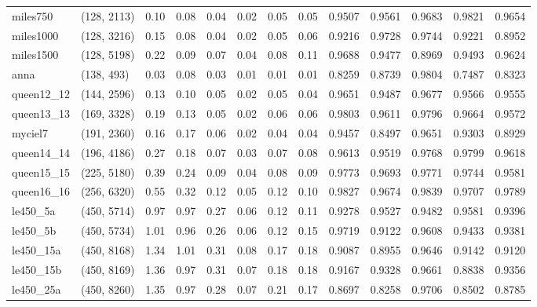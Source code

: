 \begin{tabular}{llrrrrrrrrrrr}
  miles750 &  (128, 2113) &  0.10 & 0.08 & 0.04 & 0.02 &  0.05 &   0.05 &   0.9507 &   0.9561 &    0.9683 &     0.9821 &      0.9654 \\
 miles1000 &  (128, 3216) &  0.15 & 0.08 & 0.04 & 0.02 &  0.05 &   0.06 &   0.9216 &   0.9728 &    0.9744 &     0.9221 &      0.8952 \\
 miles1500 &  (128, 5198) &  0.22 & 0.09 & 0.07 & 0.04 &  0.08 &   0.11 &   0.9688 &   0.9477 &    0.8969 &     0.9493 &      0.9624 \\
      anna &   (138, 493) &  0.03 & 0.08 & 0.03 & 0.01 &  0.01 &   0.01 &   0.8259 &   0.8739 &    0.9804 &     0.7487 &      0.8323 \\
queen12\_12 &  (144, 2596) &  0.13 & 0.10 & 0.05 & 0.02 &  0.05 &   0.04 &   0.9651 &   0.9487 &    0.9677 &     0.9566 &      0.9555 \\
queen13\_13 &  (169, 3328) &  0.19 & 0.13 & 0.05 & 0.02 &  0.06 &   0.06 &   0.9803 &   0.9611 &    0.9796 &     0.9664 &      0.9572 \\
   myciel7 &  (191, 2360) &  0.16 & 0.17 & 0.06 & 0.02 &  0.04 &   0.04 &   0.9457 &   0.8497 &    0.9651 &     0.9303 &      0.8929 \\
queen14\_14 &  (196, 4186) &  0.27 & 0.18 & 0.07 & 0.03 &  0.07 &   0.08 &   0.9613 &   0.9519 &    0.9768 &     0.9799 &      0.9618 \\
queen15\_15 &  (225, 5180) &  0.39 & 0.24 & 0.09 & 0.04 &  0.08 &   0.09 &   0.9773 &   0.9693 &    0.9771 &     0.9744 &      0.9581 \\
queen16\_16 &  (256, 6320) &  0.55 & 0.32 & 0.12 & 0.05 &  0.12 &   0.10 &   0.9827 &   0.9674 &    0.9839 &     0.9707 &      0.9789 \\
  le450\_5a &  (450, 5714) &  0.97 & 0.97 & 0.27 & 0.06 &  0.12 &   0.11 &   0.9278 &   0.9527 &    0.9482 &     0.9581 &      0.9396 \\
  le450\_5b &  (450, 5734) &  1.01 & 0.96 & 0.26 & 0.06 &  0.12 &   0.15 &   0.9719 &   0.9122 &    0.9608 &     0.9433 &      0.9381 \\
 le450\_15a &  (450, 8168) &  1.34 & 1.01 & 0.31 & 0.08 &  0.17 &   0.18 &   0.9087 &   0.8955 &    0.9646 &     0.9142 &      0.9120 \\
 le450\_15b &  (450, 8169) &  1.36 & 0.97 & 0.31 & 0.07 &  0.18 &   0.18 &   0.9167 &   0.9328 &    0.9661 &     0.8838 &      0.9356 \\
 le450\_25a &  (450, 8260) &  1.35 & 0.97 & 0.28 & 0.07 &  0.21 &   0.17 &   0.8697 &   0.8258 &    0.9706 &     0.8502 &      0.8785 \\

\end{tabular}
